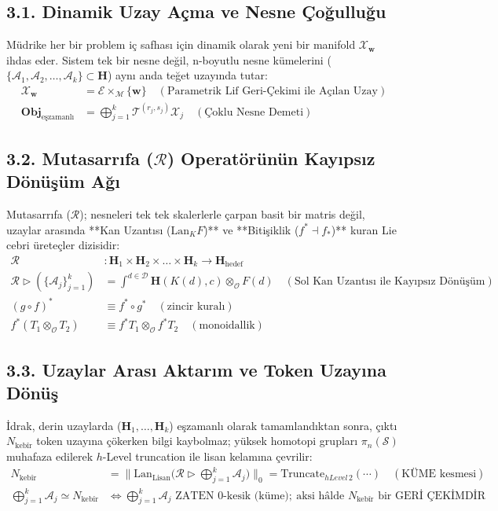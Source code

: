 \documentclass[11pt, a4paper]{article}
\begin{document}
\subsection{3.1. Dinamik Uzay Açma ve Nesne Çoğulluğu}
Müdrike her bir problem iç safhası için dinamik olarak yeni bir manifold $\mathcal{X}_{\mathbf{w}}$ ihdas eder. Sistem tek bir nesne değil, n-boyutlu nesne kümelerini ($\{\mathcal{A}_1, \mathcal{A}_2, \dots, \mathcal{A}_k\} \subset \mathbf{H}$) aynı anda teğet uzayında tutar:
\begin{align}
\mathcal{X}_{\mathbf{w}} &= \mathcal{E} \times_{\mathcal{M}} \{\mathbf{w}\} \quad (\text{Parametrik Lif Geri-Çekimi ile Açılan Uzay}) \\
\mathbf{Obj}_{\text{eşzamanlı}} &= \bigoplus_{j=1}^k \mathcal{T}^{(r_j, s_j)} \mathcal{X}_j \quad (\text{Çoklu Nesne Demeti})
\end{align}

\subsection{3.2. Mutasarrıfa ($\mathcal{R}$) Operatörünün Kayıpsız Dönüşüm Ağı}
Mutasarrıfa ($\mathcal{R}$); nesneleri tek tek skalerlerle çarpan basit bir matris değil, uzaylar arasında **Kan Uzantısı ($\text{Lan}_K F$)** ve **Bitişiklik ($f^* \dashv f_*$)** kuran Lie cebri üreteçler dizisidir:
\begin{align}
\mathcal{R} &: \mathbf{H}_1 \times \mathbf{H}_2 \times \dots \times \mathbf{H}_k \longrightarrow \mathbf{H}_{\text{hedef}} \\
\mathcal{R} \triangleright \left( \{\mathcal{A}_j\}_{j=1}^k \right) &= \int^{d \in \mathcal{D}} \mathbf{H}(K(d), c) \otimes_{\mathcal{O}} F(d) \quad (\text{Sol Kan Uzantısı ile Kayıpsız Dönüşüm}) \\
(g \circ f)^* &\equiv f^* \circ g^* \quad (\text{zincir kuralı}) \\
f^*(T_1 \otimes_{\mathcal{O}} T_2) &\equiv f^* T_1 \otimes_{\mathcal{O}} f^* T_2 \quad (\text{monoidallik})
\end{align}

\subsection{3.3. Uzaylar Arası Aktarım ve Token Uzayına Dönüş}
İdrak, derin uzaylarda ($\mathbf{H}_1, \dots, \mathbf{H}_k$) eşzamanlı olarak tamamlandıktan sonra, çıktı $N_{\text{kebîr}}$ token uzayına çökerken bilgi kaybolmaz; yüksek homotopi grupları $\pi_n(\mathcal{S})$ muhafaza edilerek $h$-Level truncation ile lisan kelamına çevrilir:
\begin{align}
N_{\text{kebîr}} &= \big\| \text{Lan}_{\text{Lisan}} \big( \mathcal{R} \triangleright \textstyle\bigoplus_{j=1}^k \mathcal{A}_j \big) \big\|_0 = \text{Truncate}_{hLevel\,2}(\cdots) \quad (\text{KÜME kesmesi}) \\
\bigoplus_{j=1}^k \mathcal{A}_j \simeq N_{\text{kebîr}} &\iff \bigoplus_{j=1}^k \mathcal{A}_j \text{ ZATEN } 0\text{-kesik (küme)}; \ \text{aksi hâlde } N_{\text{kebîr}} \text{ bir GERİ ÇEKİMDİR}
\end{align}
\end{document}
